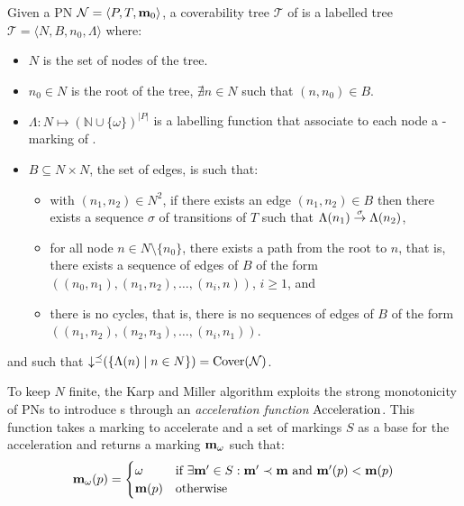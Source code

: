 \begin{defi}
  Given a \ac{PN} $\mathcal{N} = \langle P,T, \mathbf{m}_0\rangle$, a coverability tree $\mathcal{T}$ of \tupleN is a labelled tree $\mathcal{T} = \langle N, B, n_0, \Lambda\rangle$ where:
  \begin{itemize}
    \item $N$ is the set of nodes of the tree.%
    \item $n_0 \in N$ is the root of the tree,  $\nexists n \in N$ such that $(n, n_0) \in B$.
    \item $\Lambda : N \mapsto (\mathbb{N} \cup \{\omega\})^{|P|}$ is a labelling function that associate to each node a \textomega-marking of \tupleN.
    \item $B \subseteq N \times N$, the set of edges, is such that:
      \begin{itemize}
        \item with $(n_1, n_2) \in N^2$, if there exists an edge $(n_1, n_2) \in B$ then there exists a sequence $\sigma$ of transitions of $T$ such that $\Lambda(n_1) \stackrel{\sigma}{\to} \Lambda(n_2)$,
        \item for all node $n \in N \setminus \{n_0\}$, there exists a path from the root to $n$, that is, there exists a sequence of edges of $B$ of the form $((n_0, n_1), (n_1, n_2), \dots, (n_{i}, n))$, $i \geq 1$, and
        \item there is no cycles, that is, there is no sequences of edges of $B$ of the form $((n_1, n_2), (n_2, n_3), \dots, (n_i, n_1))$.
      \end{itemize}
  \end{itemize}
  and such that $\operatorname{\downarrow^\preceq}(\{\Lambda(n) \mid n \in N\}) = \operatorname{Cover}(\mathcal{N})$.
\end{defi}

To keep $N$ finite, the Karp and Miller algorithm exploits the strong monotonicity of \acp{PN} to introduce \omark{}s through an \emph{acceleration function} $\operatorname{Acceleration}$.
This function takes a marking \marq to accelerate and a set of markings $S$ as a base  for the acceleration and returns a marking $\mathbf{m}_\omega$ such that:
\[
  \mathbf{m}_\omega(p) =
  \begin{cases}
    \omega    &\text{if } \exists \mathbf{m'} \in S : \mathbf{m'} \prec \mathbf{m} \text{ and } \mathbf{m'}(p) < \mathbf{m}(p) \\
    \mathbf{m}(p)  &\text{otherwise}
  \end{cases}
\]

